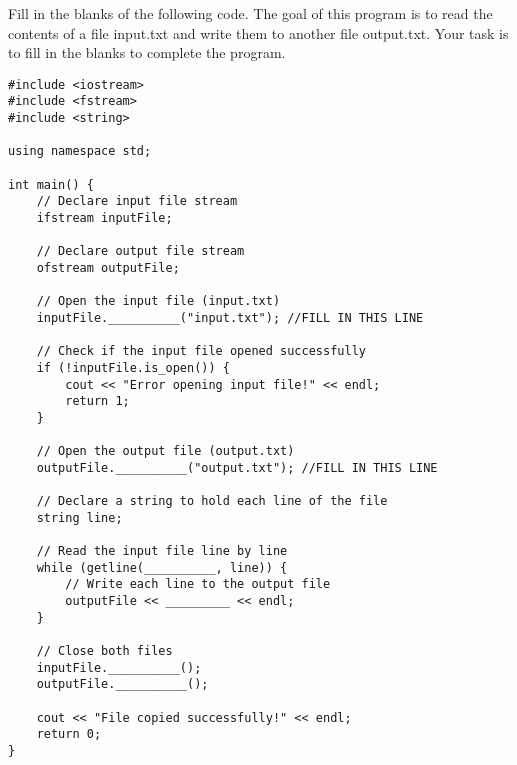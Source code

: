 \begin{problem}
Fill in the blanks of the following code. The goal of this program is to read the contents of a file input.txt and write them to another file output.txt. Your task is to fill in the blanks to complete the program.

\begin{verbatim}
#include <iostream>
#include <fstream>
#include <string>

using namespace std;

int main() {
    // Declare input file stream
    ifstream inputFile;
    
    // Declare output file stream
    ofstream outputFile;
    
    // Open the input file (input.txt)
    inputFile.__________("input.txt"); //FILL IN THIS LINE

    // Check if the input file opened successfully
    if (!inputFile.is_open()) {
        cout << "Error opening input file!" << endl;
        return 1;
    }

    // Open the output file (output.txt)
    outputFile.__________("output.txt"); //FILL IN THIS LINE

    // Declare a string to hold each line of the file
    string line;

    // Read the input file line by line
    while (getline(__________, line)) {
        // Write each line to the output file
        outputFile << _________ << endl;
    }

    // Close both files
    inputFile.__________();
    outputFile.__________();

    cout << "File copied successfully!" << endl;
    return 0;
}


\end{verbatim}
\end{problem}

